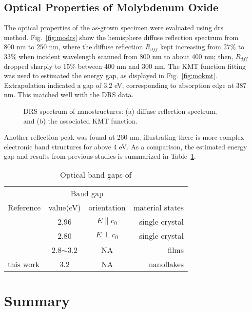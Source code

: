 \subsection{Optical Properties of Molybdenum Oxide}

%
The optical properties of the as-grown specimen were evaluated using \gls{drs} method. Fig.~\ref{fig:modrs} show the hemisphere diffuse reflection spectrum from 800 nm to 250 nm, where the diffuse reflection $R_{dff}$ kept increasing from 27\% to 33\% when incident wavelength scanned from 800 nm to about 400 nm; then, $R_{dff}$ dropped sharply to 15\% between 400 nm and 300 nm. The KMT function fitting was used to estimated the energy gap, as displayed in Fig.~\ref{fig:mokmt}. Extrapolation indicated a gap of 3.2 eV, corresponding to absorption edge at 387 nm. This matched well with the DRS data.
\begin{figure}[htb]
\centering
{}\hspace{0.04\textwidth}
\caption[DRS spectrum of  nanostructures]{DRS spectrum of  nanostructures: (a) diffuse reflection spectrum, and (b) the associated KMT function.}
\label{fig:moo3drs}
\end{figure}
Another reflection peak was found at 260 nm, illustrating there is more complex electronic band structures for  above 4 eV. As a comparison, the estimated energy gap and results from previous studies is summarized in Table~\ref{tab:mobg}.
\begin{table}[htb]
\centering
\caption{Optical band gaps of }\label{tab:mobg}
\begin{tabular}{lccr}
\toprule
&\multicolumn{2}{c}{Band gap} \\
\cmidrule(l){2-3}
Reference & value(eV) & orientation & material states\\
\midrule
\cite{Deb1968}   & 2.96  & $E\parallel c_0$ & single crystal\\
\cite{Deb1968}   & 2.80  & $E\perp c_0$ & single crystal \\
\cite{Julien1995} & 2.8$\sim$3.2 & NA & films\\
 this work  & 3.2  & NA & nanoflakes\\
\bottomrule
\end{tabular}
\end{table}

\section{Summary}

